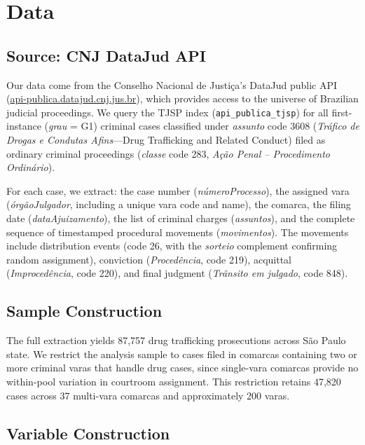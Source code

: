 \documentclass[12pt]{article}
\begin{document}
\section{Data}

\subsection{Source: CNJ DataJud API}

Our data come from the Conselho Nacional de Justi\c{c}a's DataJud public API (\url{api-publica.datajud.cnj.jus.br}), which provides access to the universe of Brazilian judicial proceedings. We query the TJSP index (\texttt{api\_publica\_tjsp}) for all first-instance (\textit{grau} = G1) criminal cases classified under \textit{assunto} code 3608 (\textit{Tr\'afico de Drogas e Condutas Afins}---Drug Trafficking and Related Conduct) filed as ordinary criminal proceedings (\textit{classe} code 283, \textit{A\c{c}\~ao Penal -- Procedimento Ordin\'ario}).

For each case, we extract: the case number (\textit{n\'umeroProcesso}), the assigned vara (\textit{\'org\~aoJulgador}, including a unique vara code and name), the comarca, the filing date (\textit{dataAjuizamento}), the list of criminal charges (\textit{assuntos}), and the complete sequence of timestamped procedural movements (\textit{movimentos}). The movements include distribution events (code 26, with the \textit{sorteio} complement confirming random assignment), conviction (\textit{Proced\^encia}, code 219), acquittal (\textit{Improced\^encia}, code 220), and final judgment (\textit{Tr\^ansito em julgado}, code 848).

\subsection{Sample Construction}

The full extraction yields 87,757 drug trafficking prosecutions across S\~ao Paulo state. We restrict the analysis sample to cases filed in comarcas containing two or more criminal varas that handle drug cases, since single-vara comarcas provide no within-pool variation in courtroom assignment. This restriction retains 47,820 cases across 37 multi-vara comarcas and approximately 200 varas.

\subsection{Variable Construction}
\end{document}
